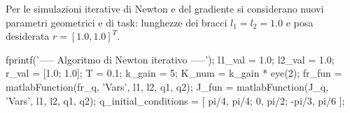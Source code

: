 \documentclass[11pt, a4paper]{article}
\begin{document}

\begin{par}
\begin{flushleft}
Per le simulazioni iterative di Newton e del gradiente si considerano nuovi parametri geometrici e di task: lunghezze dei bracci $l_1 = l_2 = 1.0$ e posa desiderata $r = [1.0, 1.0]^T$.
\end{flushleft}
\end{par}

\begin{matlabcode}
fprintf('----- Algoritmo di Newton iterativo -----');
l1_val = 1.0;
l2_val = 1.0;
r_val = [1.0; 1.0];
T = 0.1;
k_gain = 5;
K_num = k_gain * eye(2);
fr_fun = matlabFunction(fr_q, 'Vars', {l1, l2, q1, q2});
J_fun = matlabFunction(J_q, 'Vars', {l1, l2, q1, q2});
q_initial_conditions = [
    pi/4, pi/4;      %
    0, pi/2;         %
    -pi/3, pi/6      %
];
\end{matlabcode}
\newpage
\end{document}

